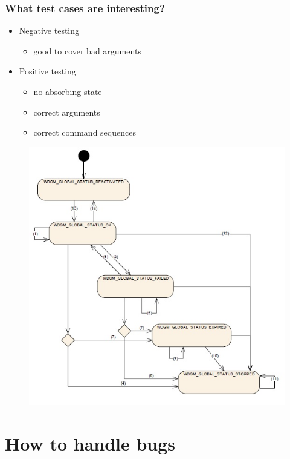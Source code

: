 \documentclass{beamer}
\begin{document}
\begin{frame}
  \frametitle{What test cases are interesting?}
  \begin{itemize}
    \item Negative testing
    \begin{itemize}
      \item good to cover bad arguments
    \end{itemize}
    \item Positive testing
    \begin{itemize}
      \item no absorbing state
      \item correct arguments
      \item correct command sequences
    \end{itemize}
  \end{itemize}
\end{frame}

\begin{frame}
  \begin{figure}
    \includegraphics[keepaspectratio, width=0.7\linewidth]{globalstatuses}
  \end{figure}
\end{frame}

\section{How to handle bugs}
\end{document}
